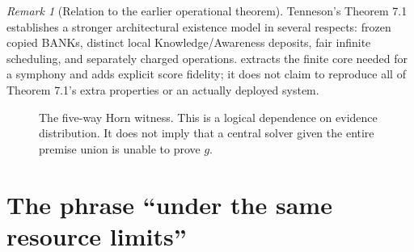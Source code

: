 \documentclass[11pt,letterpaper]{article}
\theoremstyle{definition}
\theoremstyle{remark}
\newtheorem{remark}[theorem]{Remark}
\begin{document}
\begin{remark}[Relation to the earlier operational theorem]
Tenneson's Theorem 7.1 \cite{tenneson-dreaming} establishes a stronger architectural existence model in several respects: frozen copied BANKs, distinct local Knowledge/Awareness deposits, fair infinite scheduling, and separately charged operations.  extracts the finite core needed for a symphony and adds explicit score fidelity; it does not claim to reproduce all of Theorem 7.1's extra properties or an actually deployed system.
\end{remark}

\begin{figure}[htbp]
\centering
{}
\caption{The five-way Horn witness. This is a logical dependence on evidence distribution. It does not imply that a central solver given the entire premise union is unable to prove $g$.}
\label{fig:horn}
\end{figure}

\section{The phrase ``under the same resource limits''}
\end{document}
